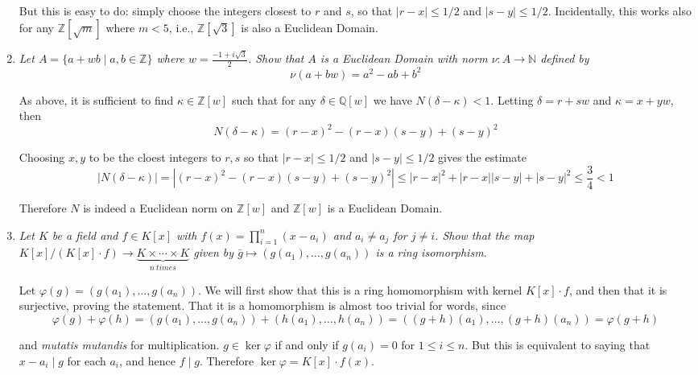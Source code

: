 \documentclass[10pt]{article}
\newcommand{\N}{\mathbb{N}}
\newcommand{\Z}{\mathbb{Z}}
\newcommand{\Q}{\mathbb{Q}}
\begin{document}
\begin{enumerate}
But this is easy to do: simply choose the integers closest to $r$ and $s$, so that $|r-x| \leq 1/2$ and $|s-y| \leq 1/2$.  Incidentally, this works also for any $\Z[\sqrt{m}]$ where $m < 5$, i.e., $\Z[\sqrt{3}]$ is also a Euclidean Domain.

\item \emph{Let $A = \{a + wb \mid a,b \in \Z\}$ where $w = \frac{-1 + i\sqrt{3}}{2}$.  Show that $A$ is a Euclidean Domain with norm $\nu:A \rightarrow \N$ defined by $$\nu(a+bw) = a^2 - ab + b^2$$}

As above, it is sufficient to find $\kappa \in \Z[w]$ such that for any $\delta \in \Q[w]$ we have $N(\delta - \kappa) < 1$.  Letting $\delta = r+sw$ and $\kappa = x + yw$, then
\[
N(\delta - \kappa) = (r-x)^2 - (r-x)(s-y) + (s-y)^2
\]

Choosing $x,y$ to be the cloest integers to $r,s$ so that $|r-x| \leq 1/2$ and $|s-y| \leq 1/2$ gives the estimate
\[
|N(\delta - \kappa)| = |(r-x)^2 - (r-x)(s-y) + (s-y)^2| \leq |r-x|^2 + |r-x||s-y| + |s-y|^2 \leq \frac{3}{4} < 1 
\]

Therefore $N$ is indeed a Euclidean norm on $\Z[w]$ and $\Z[w]$ is a Euclidean Domain.

\item \emph{Let $K$ be a field and $f \in K[x]$ with $f(x) = \prod_{i=1}^n (x-a_i)$ and $a_i \neq a_j$ for $j \neq i$.  Show that the map $K[x] / (K[x] \cdot f) \rightarrow \underbrace{K \times \cdots \times K}_{n~times}$ given by $\bar{g} \mapsto (g(a_1), \ldots, g(a_n))$ is a ring isomorphism.}

Let $\varphi(g) = (g(a_1), \ldots, g(a_n))$.  We will first show that this is a ring homomorphism with kernel $K[x] \cdot f$, and then that it is surjective, proving the statement.  That it is a homomorphism is almost too trivial for words, since
\[
\varphi(g) + \varphi(h) = (g(a_1), \ldots, g(a_n)) + (h(a_1), \ldots, h(a_n)) = ((g+h)(a_1), \ldots, (g+h)(a_n)) = \varphi(g+h)
\]

and \emph{mutatis mutandis} for multiplication.  $g \in \ker \varphi$ if and only if $g(a_i) = 0$ for $1 \leq i \leq n$.  But this is equivalent to saying that $x - a_i \mid g$ for each $a_i$, and hence $f \mid g$.  Therefore $\ker \varphi = K[x] \cdot f(x)$.


\end{enumerate}
\end{document}
